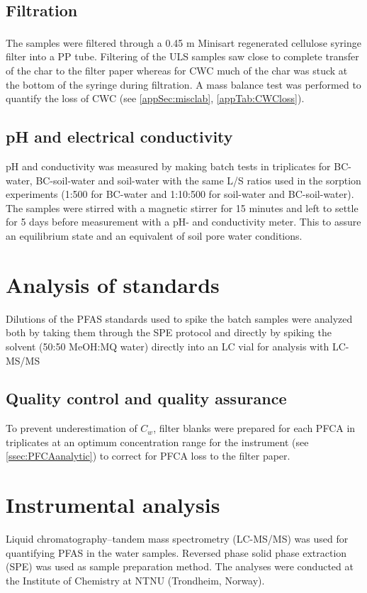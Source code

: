 \subsection{Filtration}
The samples were filtered through a 0.45 \textmu m Minisart\textsuperscript{\textregistered} regenerated cellulose syringe filter into a PP tube. Filtering of the ULS samples saw close to complete transfer of the char to the filter paper whereas for CWC much of the char was stuck at the bottom of the syringe during filtration. A mass balance test was performed to quantify the loss of CWC (see \cref{appSec:misclab}, \cref{appTab:CWCloss}).

\subsection{pH and electrical conductivity}
pH and conductivity was measured by making batch tests in triplicates for BC-water, BC-soil-water and soil-water with the same L/S ratios used in the sorption experiments (1:500 for BC-water and 1:10:500 for soil-water and BC-soil-water). The samples were stirred with a magnetic stirrer for 15 minutes and left to settle for 5 days before measurement with a pH- and conductivity meter. This to assure an equilibrium state and an equivalent of soil pore water conditions.


\section{Analysis of standards}
Dilutions of the PFAS standards used to spike the batch samples were analyzed both by taking them through the SPE protocol and directly by spiking the solvent (50:50 MeOH:MQ water) directly into an LC vial for analysis with LC-MS/MS 

\subsection{Quality control and quality assurance}
To prevent underestimation of $C_w$, filter blanks were prepared for each PFCA in triplicates at an optimum concentration range for the instrument (see \cref{ssec:PFCAanalytic}) to correct for PFCA loss to the filter paper. 

\section{Instrumental analysis} \label{methods:instrAnalysis}
Liquid chromatography--tandem mass spectrometry (LC-MS/MS) was used for quantifying PFAS in the water samples. Reversed phase solid phase extraction (SPE) was used as sample preparation method. The analyses were conducted at the Institute of Chemistry at NTNU (Trondheim, Norway).


